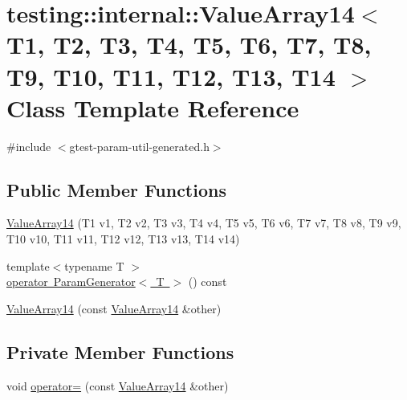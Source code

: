 \hypertarget{classtesting_1_1internal_1_1_value_array14}{}\section{testing\+::internal\+::Value\+Array14$<$ T1, T2, T3, T4, T5, T6, T7, T8, T9, T10, T11, T12, T13, T14 $>$ Class Template Reference}
\label{classtesting_1_1internal_1_1_value_array14}


{\ttfamily \#include $<$gtest-\/param-\/util-\/generated.\+h$>$}

\subsection*{Public Member Functions}
\begin{DoxyCompactItemize}
\item 
\mbox{\hyperlink{classtesting_1_1internal_1_1_value_array14_a07a09d64aba1260d403adc661546ce48}{Value\+Array14}} (T1 v1, T2 v2, T3 v3, T4 v4, T5 v5, T6 v6, T7 v7, T8 v8, T9 v9, T10 v10, T11 v11, T12 v12, T13 v13, T14 v14)
\item 
{\footnotesize template$<$typename T $>$ }\\\mbox{\hyperlink{classtesting_1_1internal_1_1_value_array14_aef77c9d7520c7313e2af66fd79185698}{operator Param\+Generator$<$ T $>$}} () const
\item 
\mbox{\hyperlink{classtesting_1_1internal_1_1_value_array14_a41d4f0e6d12c86df58b24992a06300dc}{Value\+Array14}} (const \mbox{\hyperlink{classtesting_1_1internal_1_1_value_array14}{Value\+Array14}} \&other)
\end{DoxyCompactItemize}
\subsection*{Private Member Functions}
\begin{DoxyCompactItemize}
\item 
void \mbox{\hyperlink{classtesting_1_1internal_1_1_value_array14_ac3f2c8db9a16c34a79e09b4529082c43}{operator=}} (const \mbox{\hyperlink{classtesting_1_1internal_1_1_value_array14}{Value\+Array14}} \&other)
\end{DoxyCompactItemize}
